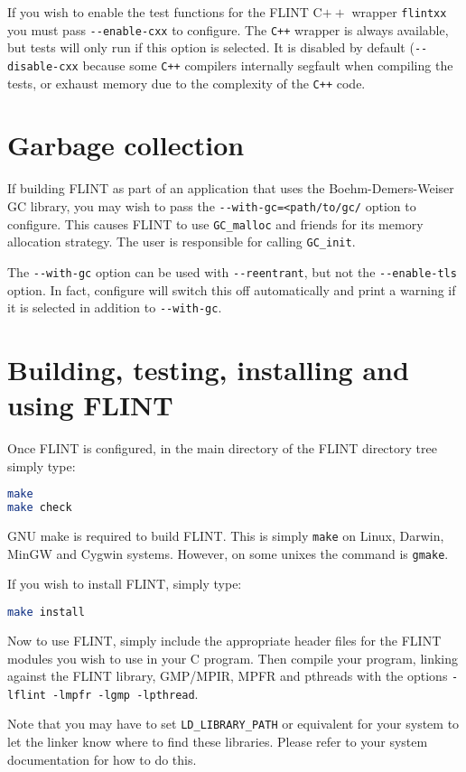 \documentclass[a4paper,10pt]{book}
\newcommand{\code}{\lstinline}
\begin{document}
If you wish to enable the test functions for the FLINT C$++$ wrapper
\code{flintxx} you must pass \code{--enable-cxx} to configure. The
\code{C++} wrapper is always available, but tests will only run if 
this option is selected. It is disabled by default (\code{--disable-cxx}
because some \code{C++} compilers internally segfault when compiling the
tests, or exhaust memory due to the complexity of the \code{C++} code.

\chapter{Garbage collection}

If building FLINT as part of an application that uses the
Boehm-Demers-Weiser GC library, you may wish to pass the
\code{--with-gc=<path/to/gc/} option to configure. This causes
FLINT to use \code{GC_malloc} and friends for its memory allocation
strategy. The user is responsible for calling \code{GC_init}.

The \code{--with-gc} option can be used with \code{--reentrant}, but not the
\code{--enable-tls} option. In fact, configure will switch this off
automatically and print a warning if it is selected in addition to
\code{--with-gc}.

\chapter{Building, testing, installing and using FLINT}

Once FLINT is configured, in the main directory of the FLINT directory
tree simply type:
\begin{lstlisting}[language=bash]
make
make check
\end{lstlisting}

GNU make is required to build FLINT. This is simply \code{make} on
Linux, Darwin, MinGW and Cygwin systems. However, on some unixes the
command is \code{gmake}.

If you wish to install FLINT, simply type:
\begin{lstlisting}[language=bash]
make install
\end{lstlisting}

Now to use FLINT, simply include the appropriate header files for
the FLINT modules you wish to use in your C program.  Then compile
your program, linking against the FLINT library, GMP/MPIR, MPFR and
pthreads with the options \code{-lflint -lmpfr -lgmp -lpthread}.

Note that you may have to set \code{LD_LIBRARY_PATH} or equivalent
for your system to let the linker know where to find these libraries.
Please refer to your system documentation for how to do this.
\end{document}
